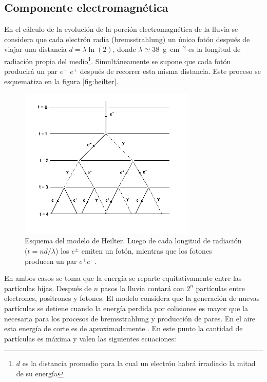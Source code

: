 \subsection{Componente electromagnética}
En el cálculo de la evolución de la porción electromagnética de la lluvia se considera que cada electrón radía (bremsstrahlung) un único fotón después de viajar una distancia $d=\lambda \ln(2)$, donde $\lambda\simeq38$~g~cm$^{-2}$ es la longitud de radiación propia del medio\footnote{$d$ es la distancia promedio para la cual un electrón habrá irradiado la mitad de su energía}. Simultáneamente se supone que cada fotón producirá un par $e^{-}$ $e^{+}$ después de recorrer esta misma distancia.
Este proceso se esquematiza en la figura \ref{fig:heilter}.
%
\begin{figure}[ht]
\begin{center}
\includegraphics[width=0.75\textwidth]{fig/EASAuger/heilterSchema}
\caption{Esquema del modelo de Heilter. Luego de cada longitud de radiación ($t=nd/\lambda$) los $e^\pm$ emiten un fotón, mientras que los fotones producen un par $e^+e^-$.}
\label{fig:showerSchema}
\end{center}
\end{figure}
%
En ambos casos se toma que la energía se reparte equitativamente entre las partículas hijas. Después de $n$ pasos la lluvia contará con $2^{n}$ partículas entre electrones, positrones y fotones. El modelo considera que la generación de nuevas partículas se detiene cuando la energía perdida por colisiones es mayor que la necesaria para los procesos de bremsstrahlung y producción de pares. En el aire esta energía de corte es de aproximadamente . En este punto la cantidad de partículas es máxima y valen las siguientes ecuaciones:
